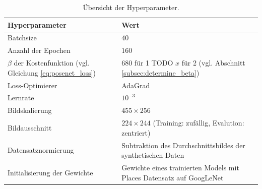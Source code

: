 \begin{table}[H]
	\centering
	\caption{Übersicht der Hyperparameter.}
	\begin{tabularx}{1.0\textwidth}{X X}
		\textbf{Hyperparameter} & \textbf{Wert}\\
		\hline
		Batchsize & $40$\\
		\hline
		Anzahl der Epochen & $160$\\
		\hline
		$\beta$ der Kostenfunktion (vgl. Gleichung \ref{eq:posenet_loss}) &
		\makecell[tl]{
			$680$ für 1 TODO\\
			$x$ für 2 (vgl. Abschnitt \ref{subsec:determine_beta})\\
		}\\
		\hline
		Loss-Optimierer & AdaGrad\\
		\hline
		Lernrate & $10^{-3}$\\
		\hline
		Bildskalierung & $455 \times 256$\\
		\hline
		Bildausschnitt& \makecell[tl]{
			$224 \times 244$\\
			(Training: zufällig, Evalution: zentriert)\\
		}\\
		\hline
		Datensatznormierung & Subtraktion des Durchschnittsbildes der synthetischen Daten \\
		\hline
		Initialisierung der Gewichte & Gewichte eines trainierten Models mit Places Datensatz auf GoogLeNet \\
	\end{tabularx}
	\label{tab:trainingparams}
\end{table}